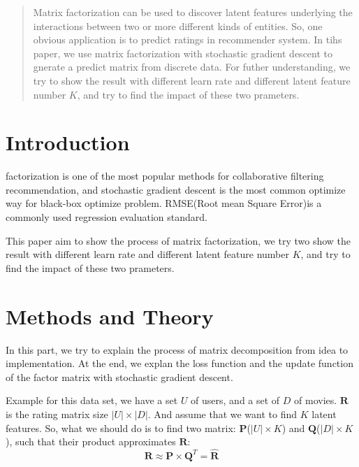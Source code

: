 \documentclass[journal, a4paper]{IEEEtran}
\begin{document}
\begin{abstract}
Matrix factorization can be used to discover latent features underlying the interactions between two or more different kinds of entities. So, one obvious application is to predict ratings in recommender system. In tihs paper, we use matrix factorization with stochastic gradient descent to gnerate a predict matrix from  discrete data. For futher understanding, we try to show the result with different learn rate and different latent feature number $K$, and try to find the impact of these two prameters. 
\end{abstract}

\section{Introduction}
 factorization is one of the most popular methods for collaborative filtering recommendation, and stochastic gradient descent is the most common optimize way for black-box optimize problem. RMSE(Root mean Square Error)is a commonly used regression evaluation standard.

This paper aim to show the process of matrix factorization, we try two show the result with different learn rate and different latent feature number $K$, and try to find the impact of these two prameters.

\section{Methods and Theory}
In this part, we try to explain the process of matrix decomposition from idea to implementation. At the end, we explan the loss function and the update function of the factor matrix with stochastic gradient descent.

Example for this data set, we have a set $U$ of users, and a set of $D$ of movies. $\boldsymbol{R}$ is the rating matrix size $|U|\times|D|$. And assume that we want to find $K$ latent features. So, what we should do is to find two matrix: $\boldsymbol{P}$($|U|\times K$) and $\boldsymbol{Q}$($|D|\times K$), such that their product approximates $\boldsymbol{R}$:
\begin{displaymath}
\boldsymbol{R}\approx \boldsymbol{P}\times \boldsymbol{Q}^T=\hat{\boldsymbol{R}}
\end{displaymath} 
\end{document}
